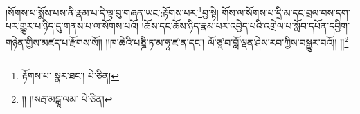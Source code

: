 །སོགས་པ་སྨོས་པས་ནི་རྣམ་པ་དེ་ལྟ་བུ་གཞན་ཡང་:རྟོགས་པར་\footnote{རྟོགས་པ་  སྣར་ཐང་།  པེ་ཅིན། }བྱ་སྟེ། གོས་ལ་སོགས་པ་དྲི་མ་དང་བྲལ་བས་དག་པར་གྱུར་པ་ཉིད་དུ་གནས་པ་ལ་སོགས་པའོ། །ཆོས་དང་ཆོས་ཉིད་རྣམ་པར་འབྱེད་པའི་འགྲེལ་པ་སློབ་དཔོན་དབྱིག་གཉེན་གྱིས་མཛད་པ་རྫོགས་སོ།། །།ཁ་ཆེའི་པཎྜི་ཏ་མ་ཧཱ་ཛ་ན་དང་། ལོ་ཙཱ་བ་བློ་ལྡན་ཤེས་རབ་ཀྱིས་བསྒྱུར་བའོ།། །།\footnote{།། །།སརྦ་མངྒཱ་ལམ་  པེ་ཅིན། }